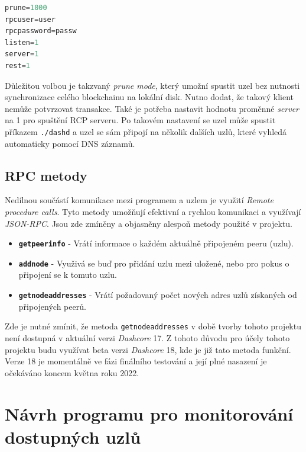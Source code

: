 \documentclass[12pt]{article}
\begin{document}
\begin{lstlisting}[language=Python, caption=\texttt{dash.conf} použito v v projektu]
prune=1000
rpcuser=user
rpcpassword=passw
listen=1
server=1
rest=1
\end{lstlisting}

\noindent Důležitou volbou je takzvaný \textit{prune mode}, který umožní spustit uzel bez nutnosti synchronizace celého blockchainu na lokální disk. Nutno dodat, že takový klient nemůže potvrzovat transakce. Také je potřeba nastavit hodnotu proměnné \textit{server} na 1 pro spuštění RCP serveru.
Po takovém nastavení se uzel může spustit příkazem \texttt{./dashd} a uzel se sám připojí na několik dalších uzlů, které vyhledá automaticky pomocí DNS záznamů. \cite{DashDisc}

\subsection{RPC metody}
Nedílnou součástí komunikace mezi programem a uzlem je využití \textit{Remote procedure calls}. \cite{DashRPC} Tyto metody umožňují efektivní a rychlou komunikaci a využívají \textit{JSON-RPC}. \cite{jsonrpc} Jsou zde zmíněny a objasněny alespoň metody použité v projektu.

\begin{itemize}
    \item \textbf{\texttt{getpeerinfo}} - Vrátí informace o každém aktuálně připojeném peeru (uzlu).
    \item \textbf{\texttt{addnode}} - Využivá se buď pro přidání uzlu mezi uložené, nebo pro pokus o připojení se k tomuto uzlu.
    \item \textbf{\texttt{getnodeaddresses}} - Vrátí požadovaný počet nových adres uzlů získaných od připojených peerů.
\end{itemize}

\noindent Zde je nutné zmínit, že metoda \texttt{getnodeaddresses} v době tvorby tohoto projektu není dostupná v aktuální verzi \textit{Dashcore} 17. Z tohoto důvodu pro účely tohoto projektu budu využívat beta verzi \textit{Dashcore} 18, kde je již tato metoda funkční. Verze 18 je momentálně ve fázi finálního testování a její plné nasazení je očekáváno koncem května roku 2022. \cite{Dash18}

\newpage

\section{Návrh programu pro monitorování dostupných uzlů}
\end{document}
